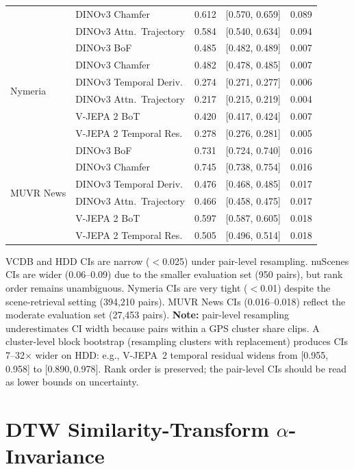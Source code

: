 \documentclass{article}
\theoremstyle{remark}
\begin{document}
\begin{table}[h]
\begin{tabular}{llccc}
 & DINOv3 Chamfer           & 0.612 & [0.570, 0.659] & 0.089 \\
 & DINOv3 Attn.\ Trajectory & 0.584 & [0.540, 0.634] & 0.094 \\
\midrule
\multirow{6}{*}{Nymeria}
 & DINOv3 BoF               & 0.485 & [0.482, 0.489] & 0.007 \\
 & DINOv3 Chamfer           & 0.482 & [0.478, 0.485] & 0.007 \\
 & DINOv3 Temporal Deriv.   & 0.274 & [0.271, 0.277] & 0.006 \\
 & DINOv3 Attn.\ Trajectory & 0.217 & [0.215, 0.219] & 0.004 \\
 & V-JEPA 2 BoT             & 0.420 & [0.417, 0.424] & 0.007 \\
 & V-JEPA 2 Temporal Res.   & 0.278 & [0.276, 0.281] & 0.005 \\
\midrule
\multirow{6}{*}{MUVR News}
 & DINOv3 BoF               & 0.731 & [0.724, 0.740] & 0.016 \\
 & DINOv3 Chamfer           & 0.745 & [0.738, 0.754] & 0.016 \\
 & DINOv3 Temporal Deriv.   & 0.476 & [0.468, 0.485] & 0.017 \\
 & DINOv3 Attn.\ Trajectory & 0.466 & [0.458, 0.475] & 0.017 \\
 & V-JEPA 2 BoT             & 0.597 & [0.587, 0.605] & 0.018 \\
 & V-JEPA 2 Temporal Res.   & 0.505 & [0.496, 0.514] & 0.018 \\
\bottomrule
\end{tabular}
\begin{flushleft}
\small VCDB and HDD CIs are narrow ($<$0.025) under pair-level resampling. nuScenes CIs are wider (0.06--0.09) due to the smaller evaluation set (950 pairs), but rank order remains unambiguous. Nymeria CIs are very tight ($<$0.01) despite the scene-retrieval setting (394{,}210 pairs). MUVR News CIs (0.016--0.018) reflect the moderate evaluation set (27{,}453 pairs). \textbf{Note:} pair-level resampling underestimates CI width because pairs within a GPS cluster share clips. A cluster-level block bootstrap (resampling clusters with replacement) produces CIs 7--32$\times$ wider on HDD: e.g., V-JEPA~2 temporal residual widens from [0.955,\,0.958] to [0.890,\,0.978]. Rank order is preserved; the pair-level CIs should be read as lower bounds on uncertainty.
\end{flushleft}
\end{table}

\section{DTW Similarity-Transform $\alpha$-Invariance}
\label{sec:alpha_sweep}
\end{document}
